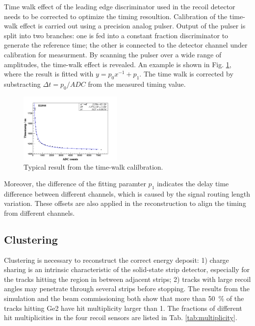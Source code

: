 \documentclass[number,5p]{elsarticle}
\begin{document}
Time walk effect of the leading edge discriminator used in the recoil detector needs to be corrected to
optimize the timing resoultion.
Calibration of the time-walk effect is carried out using a  precision analog pulser. 
Output of the pulser is split into two branches: one is fed into a constant fraction discriminator to generate the reference time;
the other is connected to the detector channel under calibration for measurment. 
By scanning the pulser over a wide range of amplitudes, the time-walk effect is
revealed.
An example is shown in Fig. \ref{fig:timewalk}, where the result is fitted with \(y=p_0 x^{-1} + p_1\). 
The time walk is corrected by substracting \(\Delta t = p_0/ADC\) from the
measured timing value.

\begin{figure}[htbp]
  \centering
  \includegraphics[width=0.45\textwidth]{./timewalk.png}
  \caption{Typical result from the time-walk calilbration.}
  \label{fig:timewalk}
\end{figure}

Moreover, the difference of the fitting paramter \(p_1\) indicates the delay time
difference between different channels, which is caused by the signal routing length variation.
These offsets are also applied in the reconstruction to align the timing from different channels.

\subsection{Clustering}
\label{clustering}

Clustering is necessary to reconstruct the correct energy deposit:
1) charge sharing is an intrinsic characteristic of the solid-state strip detector, especially
for the tracks hitting the region in between adjacent strips; 2) tracks with
large recoil angles may penetrate through several strips before stopping.
The results from the simulation and the beam commissioning both show that more than \SI{50}{\percent} of the tracks hitting Ge2 have hit multiplicity
larger than 1. The fractions of different hit multiplicities in the four
recoil sensors are listed in Tab. \ref{tab:multiplicity}.
\end{document}
